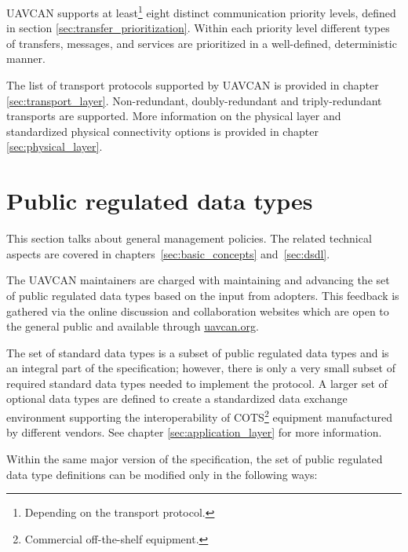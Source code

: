UAVCAN supports at least\footnote{Depending on the transport protocol.} eight distinct communication priority levels,
defined in section \ref{sec:transfer_prioritization}.
Within each priority level different types of transfers, messages, and services are
prioritized in a well-defined, deterministic manner.

The list of transport protocols supported by UAVCAN is provided in chapter \ref{sec:transport_layer}.
Non-redundant, doubly-redundant and triply-redundant transports are supported.
More information on the physical layer and standardized physical connectivity options
is provided in chapter \ref{sec:physical_layer}.

\section{Public regulated data types}

This section talks about general management policies.
The related technical aspects are covered in chapters~\ref{sec:basic_concepts} and~\ref{sec:dsdl}.

The UAVCAN maintainers are charged with maintaining and advancing the set of
public regulated data types based on the input from adopters.
This feedback is gathered via the online discussion and collaboration websites
which are open to the general public and available through \href{http://uavcan.org}{uavcan.org}.

The set of standard data types is a subset of public regulated data types and is an integral part of the specification;
however, there is only a very small subset of required standard data types needed to implement the protocol.
A larger set of optional data types are defined to create a standardized data exchange environment
supporting the interoperability of COTS\footnote{Commercial off-the-shelf equipment.}
equipment manufactured by different vendors.
See chapter \ref{sec:application_layer} for more information.

Within the same major version of the specification,
the set of public regulated data type definitions can be modified only in the following ways:

